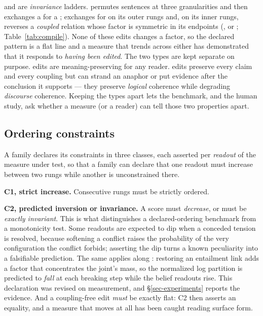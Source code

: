 and  are \emph{invariance} ladders.  permutes sentences at
three granularities and then exchanges a  for a ; 
exchanges  for  on its outer rungs and, on its inner rungs, reverses a
\emph{coupled} relation whose factor is symmetric in its endpoints (, 
or ; Table~\ref{tab:compile}). None of these edits changes a factor, so the declared
pattern is a flat line and a measure that trends across either has demonstrated that it responds to \emph{having been edited}. The two types are kept
separate on purpose.  edits are meaning-preserving for any reader.  edits
preserve every claim and every coupling but can strand an anaphor or put evidence after the conclusion it
supports --- they preserve \emph{logical} coherence while degrading \emph{discourse} coherence. Keeping the
types apart lets the benchmark, and the human study, ask whether a measure (or a reader) can tell those two
properties apart.

\subsection{Ordering constraints}
\label{sec-constraints}

A family declares its constraints in three classes, each asserted per \emph{readout} of the measure under
test, so that a family can declare that one readout must increase between two rungs while another is
unconstrained there.

\textbf{C1, strict increase.} Consecutive rungs must be strictly ordered.

\textbf{C2, predicted inversion or invariance.} A score must \emph{decrease}, or must be \emph{exactly
invariant}. This is what distinguishes a declared-ordering benchmark from a monotonicity test. Some readouts
are expected to dip when a conceded tension is resolved, because softening a conflict raises the
probability of the very configuration the conflict forbids; asserting the dip turns a known peculiarity
into a falsifiable prediction. The same applies along : restoring an entailment link adds a
factor that concentrates the joint's mass, so the normalized log partition is predicted to \emph{fall} at
each breaking step while the belief readouts rise. This declaration was revised on measurement, and
\S\ref{sec-experiments} reports the evidence. And a coupling-free edit \emph{must} be exactly flat: C2
then asserts an equality, and a measure that moves at all has been caught reading surface form.

